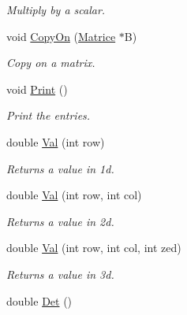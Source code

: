 \begin{DoxyCompactItemize}
\begin{DoxyCompactList}\small\item\em \-Multiply by a scalar. \end{DoxyCompactList}\item 
\hypertarget{classMatrice_a2639c6c871beec77d99b2a28c4b77610}{void \hyperlink{classMatrice_a2639c6c871beec77d99b2a28c4b77610}{\-Copy\-On} (\hyperlink{classMatrice}{\-Matrice} $\ast$\-B)}\label{classMatrice_a2639c6c871beec77d99b2a28c4b77610}

\begin{DoxyCompactList}\small\item\em \-Copy on a matrix. \end{DoxyCompactList}\item 
\hypertarget{classMatrice_a9dcac18006ce057b8d78c847174c1362}{void \hyperlink{classMatrice_a9dcac18006ce057b8d78c847174c1362}{\-Print} ()}\label{classMatrice_a9dcac18006ce057b8d78c847174c1362}

\begin{DoxyCompactList}\small\item\em \-Print the entries. \end{DoxyCompactList}\item 
\hypertarget{classMatrice_a2a233d9af97c320a1b372ededf056886}{double \hyperlink{classMatrice_a2a233d9af97c320a1b372ededf056886}{\-Val} (int row)}\label{classMatrice_a2a233d9af97c320a1b372ededf056886}

\begin{DoxyCompactList}\small\item\em \-Returns a value in 1d. \end{DoxyCompactList}\item 
\hypertarget{classMatrice_a3186a2a78ed4c487f22fb21081e3909a}{double \hyperlink{classMatrice_a3186a2a78ed4c487f22fb21081e3909a}{\-Val} (int row, int col)}\label{classMatrice_a3186a2a78ed4c487f22fb21081e3909a}

\begin{DoxyCompactList}\small\item\em \-Returns a value in 2d. \end{DoxyCompactList}\item 
\hypertarget{classMatrice_a73cd8ec182ae5748a462a9b724b664ff}{double \hyperlink{classMatrice_a73cd8ec182ae5748a462a9b724b664ff}{\-Val} (int row, int col, int zed)}\label{classMatrice_a73cd8ec182ae5748a462a9b724b664ff}

\begin{DoxyCompactList}\small\item\em \-Returns a value in 3d. \end{DoxyCompactList}\item 
\hypertarget{classMatrice_ae9aabce3db6cb0b00f6e79f9c6f7fd05}{double \hyperlink{classMatrice_ae9aabce3db6cb0b00f6e79f9c6f7fd05}{\-Det} ()}\label{classMatrice_ae9aabce3db6cb0b00f6e79f9c6f7fd05}


\end{DoxyCompactItemize}

